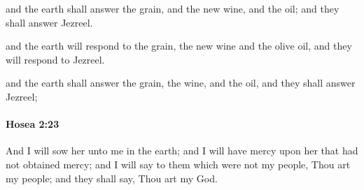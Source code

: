 			\begin{versebox}
					\item[BHS] 
					\item[LXX] 
					\item[ASV] and the earth shall answer the grain, and the new wine, and the oil; and they shall answer Jezreel.
					\item[NIV] and the earth will respond to the grain, the new wine and the olive oil, and they will respond to Jezreel.
					\item[NRSV] and the earth shall answer the grain, the wine, and the oil, and they shall answer Jezreel;
			\end{versebox}

		\paragraph{Hosea 2:23} %
			\label{HOSEA-2-23}

			And I will sow her unto me in the earth; and I will have mercy upon her that had not obtained mercy; and I will say to them which were not my people, Thou art my people; and they shall say, Thou art my God.

